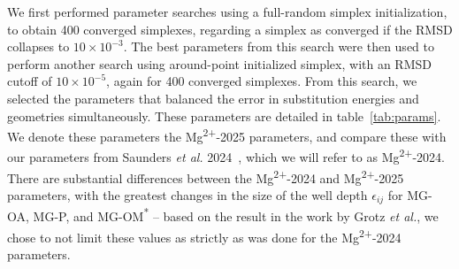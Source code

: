\documentclass[12pt,openany,final]{book}
\newcommand{\etal}{\textit{et al.}}
\newcommand{\epsilonij}{$\epsilon_{ij}$}
\newcommand{\mg}{Mg\textsuperscript{2+}}
\begin{document}
We first performed parameter searches using a full-random simplex initialization,
to obtain 400 converged simplexes, regarding a simplex as converged if the RMSD collapses to $10\times{}10^{-3}$. The best parameters from this search were then used
to perform another search using around-point initialized simplex, with an RMSD cutoff of $10\times{}10^{-5}$, again for 400 converged simplexes. From this search, we selected the parameters that balanced
the error in substitution energies and geometries simultaneously.
These parameters are detailed in table~\ref{tab:params}. We denote these parameters the \mg{-2025} parameters, and compare these with our parameters from
Saunders \etal{} 2024~\cite{saunders:2024}, which we will refer to as \mg{-2024}.
There are substantial differences between the \mg{-2024} and \mg{-2025} parameters, with the greatest changes in the size of the well depth \epsilonij{} for MG-OA, MG-P, and MG-OM\textsuperscript{*} -- based on the
result in the work by Grotz \etal{}\cite{grotz:2021:optimized}, we chose to not limit these values as strictly as was done for the \mg{-2024} parameters.
\end{document}
